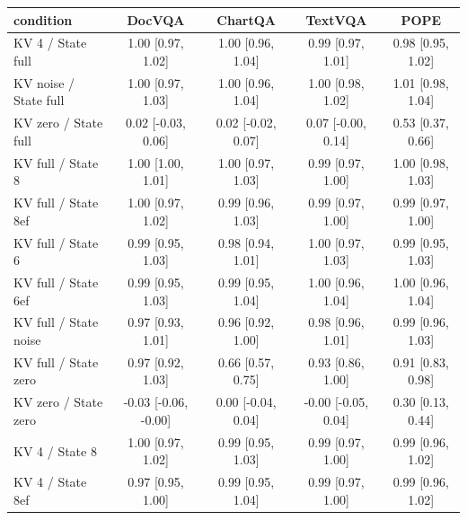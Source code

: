 \begin{tabular}{lcccc}
\toprule
condition & DocVQA & ChartQA & TextVQA & POPE \\
\midrule
KV 4 / State full & 1.00 {\scriptsize[0.97, 1.02]} & 1.00 {\scriptsize[0.96, 1.04]} & 0.99 {\scriptsize[0.97, 1.01]} & 0.98 {\scriptsize[0.95, 1.02]} \\
KV noise / State full & 1.00 {\scriptsize[0.97, 1.03]} & 1.00 {\scriptsize[0.96, 1.04]} & 1.00 {\scriptsize[0.98, 1.02]} & 1.01 {\scriptsize[0.98, 1.04]} \\
KV zero / State full & 0.02 {\scriptsize[-0.03, 0.06]} & 0.02 {\scriptsize[-0.02, 0.07]} & 0.07 {\scriptsize[-0.00, 0.14]} & 0.53 {\scriptsize[0.37, 0.66]} \\
KV full / State 8 & 1.00 {\scriptsize[1.00, 1.01]} & 1.00 {\scriptsize[0.97, 1.03]} & 0.99 {\scriptsize[0.97, 1.00]} & 1.00 {\scriptsize[0.98, 1.03]} \\
KV full / State 8ef & 1.00 {\scriptsize[0.97, 1.02]} & 0.99 {\scriptsize[0.96, 1.03]} & 0.99 {\scriptsize[0.97, 1.00]} & 0.99 {\scriptsize[0.97, 1.00]} \\
KV full / State 6 & 0.99 {\scriptsize[0.95, 1.03]} & 0.98 {\scriptsize[0.94, 1.01]} & 1.00 {\scriptsize[0.97, 1.03]} & 0.99 {\scriptsize[0.95, 1.03]} \\
KV full / State 6ef & 0.99 {\scriptsize[0.95, 1.03]} & 0.99 {\scriptsize[0.95, 1.04]} & 1.00 {\scriptsize[0.96, 1.04]} & 1.00 {\scriptsize[0.96, 1.04]} \\
KV full / State noise & 0.97 {\scriptsize[0.93, 1.01]} & 0.96 {\scriptsize[0.92, 1.00]} & 0.98 {\scriptsize[0.96, 1.01]} & 0.99 {\scriptsize[0.96, 1.03]} \\
KV full / State zero & 0.97 {\scriptsize[0.92, 1.03]} & 0.66 {\scriptsize[0.57, 0.75]} & 0.93 {\scriptsize[0.86, 1.00]} & 0.91 {\scriptsize[0.83, 0.98]} \\
KV zero / State zero & -0.03 {\scriptsize[-0.06, -0.00]} & 0.00 {\scriptsize[-0.04, 0.04]} & -0.00 {\scriptsize[-0.05, 0.04]} & 0.30 {\scriptsize[0.13, 0.44]} \\
KV 4 / State 8 & 1.00 {\scriptsize[0.97, 1.02]} & 0.99 {\scriptsize[0.95, 1.03]} & 0.99 {\scriptsize[0.97, 1.00]} & 0.99 {\scriptsize[0.96, 1.02]} \\
KV 4 / State 8ef & 0.97 {\scriptsize[0.95, 1.00]} & 0.99 {\scriptsize[0.95, 1.04]} & 0.99 {\scriptsize[0.97, 1.00]} & 0.99 {\scriptsize[0.96, 1.02]} \\

\end{tabular}
